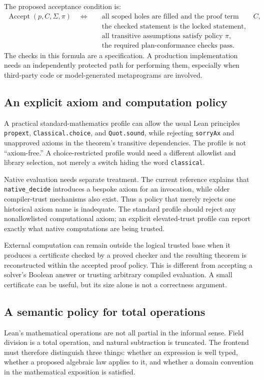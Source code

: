\documentclass[11pt,a4paper]{article}
\newcommand{\code}[1]{\nolinkurl{#1}}
\theoremstyle{definition}
\theoremstyle{remark}
\numberwithin{equation}{section}
\begin{document}
The proposed acceptance condition is:
\begin{equation}\label{eq:accept}
\begin{split}
\operatorname{Accept}(p,C,\Sigma,\pi)\quad\Longleftrightarrow\quad&
 \text{all scoped holes are filled and the proof term checks at }C,\\
 &\text{the checked statement is the locked statement},\\
 &\text{all transitive assumptions satisfy policy }\pi,\\
 &\text{the required plan-conformance checks pass}.
\end{split}
\end{equation}
The checks in this formula are a specification. A production implementation needs an independently protected path for performing them, especially when third-party code or model-generated metaprograms are involved.

\subsection{An explicit axiom and computation policy}
A practical standard-mathematics profile can allow the usual Lean principles \code{propext}, \code{Classical.choice}, and \code{Quot.sound}, while rejecting \code{sorryAx} and unapproved axioms in the theorem's transitive dependencies. The profile is not ``axiom-free.'' A choice-restricted profile would need a different allowlist and library selection, not merely a switch hiding the word \code{classical}.\cite{lean-axioms,lean-choice}

Native evaluation needs separate treatment. The current reference explains that \code{native_decide} introduces a bespoke axiom for an invocation, while older compiler-trust mechanisms also exist. Thus a policy that merely rejects one historical axiom name is inadequate.\cite{lean-axioms} The standard profile should reject any nonallowlisted computational axiom; an explicit elevated-trust profile can report exactly what native computations are being trusted.

External computation can remain outside the logical trusted base when it produces a certificate checked by a proved checker and the resulting theorem is reconstructed within the accepted proof policy. This is different from accepting a solver's Boolean answer or trusting arbitrary compiled evaluation. A small certificate can be useful, but its size alone is not a correctness argument.

\subsection{A semantic policy for total operations}
Lean's mathematical operations are not all partial in the informal sense. Field division is a total operation, and natural subtraction is truncated.\cite{lean-reference,lean-nat} The frontend must therefore distinguish three things: whether an expression is well typed, whether a proposed algebraic law applies to it, and whether a domain convention in the mathematical exposition is satisfied.
\end{document}
